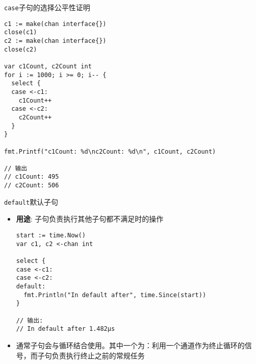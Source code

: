 \begin{frame}[fragile]{\texttt{case}子句的选择公平性证明}
\begin{lstlisting}
c1 := make(chan interface{})
close(c1)
c2 := make(chan interface{})
close(c2)

var c1Count, c2Count int
for i := 1000; i >= 0; i-- {
  select {
  case <-c1:
    c1Count++
  case <-c2:
    c2Count++
  }
}

fmt.Printf("c1Count: %d\nc2Count: %d\n", c1Count, c2Count)

// 输出
// c1Count: 495
// c2Count: 506
\end{lstlisting}    
\end{frame}

\begin{frame}[fragile]{\texttt{default}默认子句}
\begin{itemize}
    \item \textbf{用途}: 子句负责执行其他子句都不满足时的操作
\begin{lstlisting}
start := time.Now()
var c1, c2 <-chan int

select {
case <-c1:
case <-c2:
default:
  fmt.Println("In default after", time.Since(start))
}

// 输出:
// In default after 1.482µs
\end{lstlisting}
    \item 通常子句会与循环结合使用。其中一个为：利用一个通道作为终止循环的信号，而子句负责执行终止之前的常规任务
\end{itemize}
\end{frame}